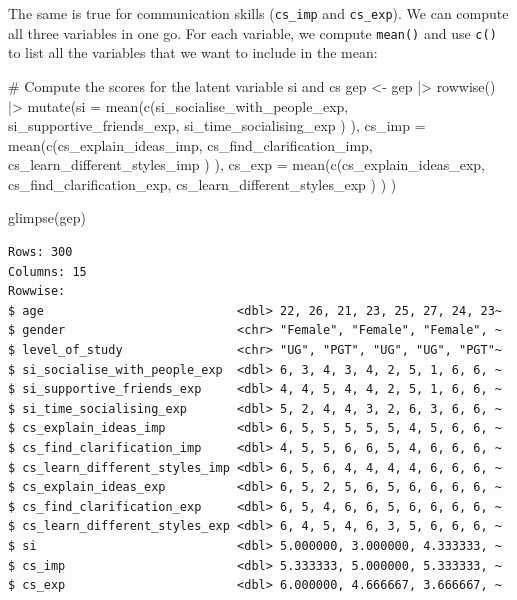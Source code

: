 \documentclass[
  letterpaper,
]{krantz}
\makeatletter
\newenvironment{Shaded}{\begin{snugshade}}{\end{snugshade}}
\newcommand{\AttributeTok}[1]{\textcolor[rgb]{0.40,0.45,0.13}{#1}}
\newcommand{\CommentTok}[1]{\textcolor[rgb]{0.37,0.37,0.37}{#1}}
\newcommand{\FunctionTok}[1]{\textcolor[rgb]{0.28,0.35,0.67}{#1}}
\newcommand{\NormalTok}[1]{\textcolor[rgb]{0.00,0.23,0.31}{#1}}
\newcommand{\OtherTok}[1]{\textcolor[rgb]{0.00,0.23,0.31}{#1}}
\newcommand{\SpecialCharTok}[1]{\textcolor[rgb]{0.37,0.37,0.37}{#1}}
\newenvironment{kframe}{%
\medskip{}
\setlength{\fboxsep}{.8em}
 \def\at@end@of@kframe{}%
 \ifinner\ifhmode%
  \def\at@end@of@kframe{\end{minipage}}%
  \begin{minipage}{\columnwidth}%
 \fi\fi%
 \def\FrameCommand##1{\hskip\@totalleftmargin \hskip-\fboxsep
 \colorbox{shadecolor}{##1}\hskip-\fboxsep
     \hskip-\linewidth \hskip-\@totalleftmargin \hskip\columnwidth}%
 \MakeFramed {\advance\hsize-\width
   \@totalleftmargin\z@ \linewidth\hsize
   \@setminipage}}%
 {\par\unskip\endMakeFramed%
 \at@end@of@kframe}
\renewenvironment{Shaded}{\begin{kframe}}{\end{kframe}}
\makeatother
\begin{document}
The same is true for communication skills (\texttt{cs\_imp} and
\texttt{cs\_exp}). We can compute all three variables in one go. For
each variable, we compute \texttt{mean()} and use \texttt{c()} to list
all the variables that we want to include in the mean:

\begin{Shaded}
\begin{Highlighting}[]
\CommentTok{\# Compute the scores for the latent variable \textquotesingle{}si\textquotesingle{} and \textquotesingle{}cs\textquotesingle{}}
\NormalTok{gep }\OtherTok{\textless{}{-}}
\NormalTok{  gep }\SpecialCharTok{|\textgreater{}}
  \FunctionTok{rowwise}\NormalTok{() }\SpecialCharTok{|\textgreater{}}
  \FunctionTok{mutate}\NormalTok{(}\AttributeTok{si =} \FunctionTok{mean}\NormalTok{(}\FunctionTok{c}\NormalTok{(si\_socialise\_with\_people\_exp,}
\NormalTok{                     si\_supportive\_friends\_exp,}
\NormalTok{                     si\_time\_socialising\_exp}
\NormalTok{                     )}
\NormalTok{                   ),}
         \AttributeTok{cs\_imp =} \FunctionTok{mean}\NormalTok{(}\FunctionTok{c}\NormalTok{(cs\_explain\_ideas\_imp,}
\NormalTok{                         cs\_find\_clarification\_imp,}
\NormalTok{                         cs\_learn\_different\_styles\_imp}
\NormalTok{                         )}
\NormalTok{                       ),}
         \AttributeTok{cs\_exp =} \FunctionTok{mean}\NormalTok{(}\FunctionTok{c}\NormalTok{(cs\_explain\_ideas\_exp,}
\NormalTok{                         cs\_find\_clarification\_exp,}
\NormalTok{                         cs\_learn\_different\_styles\_exp}
\NormalTok{                         )}
\NormalTok{                       )}
\NormalTok{         )}

\FunctionTok{glimpse}\NormalTok{(gep)}
\end{Highlighting}
\end{Shaded}

\begin{verbatim}
Rows: 300
Columns: 15
Rowwise: 
$ age                           <dbl> 22, 26, 21, 23, 25, 27, 24, 23~
$ gender                        <chr> "Female", "Female", "Female", ~
$ level_of_study                <chr> "UG", "PGT", "UG", "UG", "PGT"~
$ si_socialise_with_people_exp  <dbl> 6, 3, 4, 3, 4, 2, 5, 1, 6, 6, ~
$ si_supportive_friends_exp     <dbl> 4, 4, 5, 4, 4, 2, 5, 1, 6, 6, ~
$ si_time_socialising_exp       <dbl> 5, 2, 4, 4, 3, 2, 6, 3, 6, 6, ~
$ cs_explain_ideas_imp          <dbl> 6, 5, 5, 5, 5, 5, 4, 5, 6, 6, ~
$ cs_find_clarification_imp     <dbl> 4, 5, 5, 6, 6, 5, 4, 6, 6, 6, ~
$ cs_learn_different_styles_imp <dbl> 6, 5, 6, 4, 4, 4, 4, 6, 6, 6, ~
$ cs_explain_ideas_exp          <dbl> 6, 5, 2, 5, 6, 5, 6, 6, 6, 6, ~
$ cs_find_clarification_exp     <dbl> 6, 5, 4, 6, 6, 5, 6, 6, 6, 6, ~
$ cs_learn_different_styles_exp <dbl> 6, 4, 5, 4, 6, 3, 5, 6, 6, 6, ~
$ si                            <dbl> 5.000000, 3.000000, 4.333333, ~
$ cs_imp                        <dbl> 5.333333, 5.000000, 5.333333, ~
$ cs_exp                        <dbl> 6.000000, 4.666667, 3.666667, ~
\end{verbatim}
\end{document}
